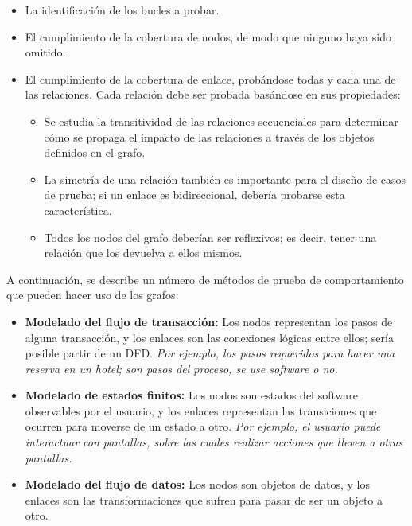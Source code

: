 \begin{itemize}
    \item La identificación de los bucles a probar.
    \item El cumplimiento de la cobertura de nodos, de modo que ninguno haya sido omitido.
    \item El cumplimiento de la cobertura de enlace, probándose todas y cada una de las relaciones. Cada relación debe ser probada basándose en sus propiedades:
    \begin{itemize}
        \item Se estudia la transitividad de las relaciones secuenciales para determinar cómo se propaga el impacto de las relaciones a través de los objetos definidos en el grafo.
        \item La simetría de una relación también es importante para el diseño de casos de prueba; si un enlace es bidireccional, debería probarse esta característica.
        \item Todos los nodos del grafo deberían ser reflexivos; es decir, tener una relación que los devuelva a ellos mismos. %
    \end{itemize}
\end{itemize}

A continuación, se describe un número de métodos de prueba de comportamiento que pueden hacer uso de los grafos:

\begin{itemize}
    \item \textbf{Modelado del flujo de transacción:} Los nodos representan los pasos de alguna transacción, y los enlaces son las conexiones lógicas entre ellos; sería posible partir de un DFD. \textit{Por ejemplo, los pasos requeridos para hacer una reserva en un hotel; son pasos del proceso, se use software o no.}
    \item \textbf{Modelado de estados finitos:} Los nodos son estados del software observables por el usuario, y los enlaces representan las transiciones que ocurren para moverse de un estado a otro. \textit{Por ejemplo, el usuario puede interactuar con pantallas, sobre las cuales realizar acciones que lleven a otras pantallas.}
    \item \textbf{Modelado del flujo de datos:} Los nodos son objetos de datos, y los enlaces son las transformaciones que sufren para pasar de ser un objeto a otro.
\end{itemize}

